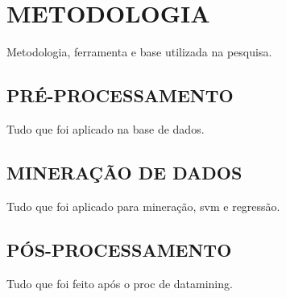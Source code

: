
\chapter{METODOLOGIA}
\label{chap:metodologia}
Metodologia, ferramenta e base utilizada na pesquisa.

\section{PRÉ-PROCESSAMENTO}
\label{sec:metodologiaPreProc}
Tudo que foi aplicado na base de dados.

\section{MINERAÇÃO DE DADOS}
\label{sec:metodologiaMine}
Tudo que foi aplicado para mineração, svm e regressão.

\section{PÓS-PROCESSAMENTO}
\label{sec:metodologiaPosProc}
Tudo que foi feito após o proc de datamining.